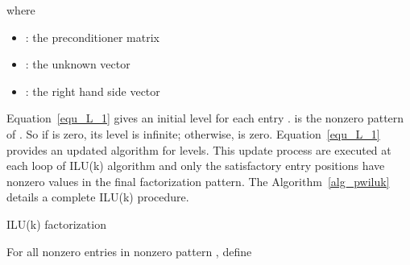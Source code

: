 \documentclass[runningheads,a4paper]{llncs}
\begin{document}
{where
\begin{itemize}\itemsep1pt \parskip0pt 
  \item : the preconditioner matrix
  \item : the unknown vector
  \item : the right hand side vector
\end{itemize}








Equation~\ref{equ_L_1} gives an initial level for each entry .  is the nonzero pattern of . So if  is zero, its level  is infinite; otherwise,  is zero. Equation~\eqref{equ_L_1} provides an updated algorithm for levels. This update process are executed at each loop of ILU(k) algorithm and only the satisfactory entry positions have nonzero values in the final factorization pattern. The Algorithm~\ref{alg_pwiluk} details a complete ILU(k) procedure.

\begin{algorithm}[!htb]
\caption{ILU(k) factorization} \label{alg_pwiluk}
\begin{algorithmic}[1]
\State For all nonzero entries in nonzero pattern , define 
 \For {}
  \For { \& }
   \State 
     \For {}
     \State 
     \State 
     \EndFor
  \EndFor
  \If {}
     \State 
  \EndIf
\EndFor
\end{algorithmic}
\end{algorithm}

}
\end{document}
